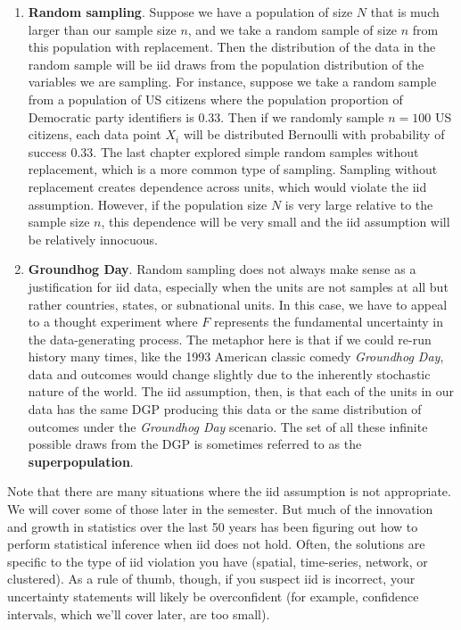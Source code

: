 \documentclass[
  letterpaper,
  DIV=11,
  numbers=noendperiod]{scrreprt}
\providecommand{\tightlist}{%
  \setlength{\itemsep}{0pt}\setlength{\parskip}{0pt}}\usepackage{longtable,booktabs,array}
\theoremstyle{definition}
\theoremstyle{definition}
\theoremstyle{plain}
\theoremstyle{remark}
\begin{document}
\begin{enumerate}
\def\labelenumi{\arabic{enumi}.}
\tightlist
\item
  \textbf{Random sampling}. Suppose we have a population of size \(N\)
  that is much larger than our sample size \(n\), and we take a random
  sample of size \(n\) from this population with replacement. Then the
  distribution of the data in the random sample will be iid draws from
  the population distribution of the variables we are sampling. For
  instance, suppose we take a random sample from a population of US
  citizens where the population proportion of Democratic party
  identifiers is 0.33. Then if we randomly sample \(n = 100\) US
  citizens, each data point \(X_i\) will be distributed Bernoulli with
  probability of success 0.33. The last chapter explored simple random
  samples without replacement, which is a more common type of sampling.
  Sampling without replacement creates dependence across units, which
  would violate the iid assumption. However, if the population size
  \(N\) is very large relative to the sample size \(n\), this dependence
  will be very small and the iid assumption will be relatively
  innocuous.
\item
  \textbf{Groundhog Day}. Random sampling does not always make sense as
  a justification for iid data, especially when the units are not
  samples at all but rather countries, states, or subnational units. In
  this case, we have to appeal to a thought experiment where \(F\)
  represents the fundamental uncertainty in the data-generating process.
  The metaphor here is that if we could re-run history many times, like
  the 1993 American classic comedy \emph{Groundhog Day}, data and
  outcomes would change slightly due to the inherently stochastic nature
  of the world. The iid assumption, then, is that each of the units in
  our data has the same DGP producing this data or the same distribution
  of outcomes under the \emph{Groundhog Day} scenario. The set of all
  these infinite possible draws from the DGP is sometimes referred to as
  the \textbf{superpopulation}.
\end{enumerate}

Note that there are many situations where the iid assumption is not
appropriate. We will cover some of those later in the semester. But much
of the innovation and growth in statistics over the last 50 years has
been figuring out how to perform statistical inference when iid does not
hold. Often, the solutions are specific to the type of iid violation you
have (spatial, time-series, network, or clustered). As a rule of thumb,
though, if you suspect iid is incorrect, your uncertainty statements
will likely be overconfident (for example, confidence intervals, which
we'll cover later, are too small).
\end{document}
